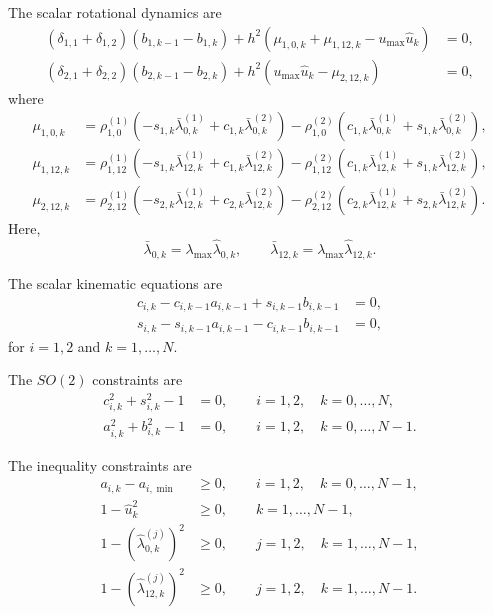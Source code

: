 The scalar rotational dynamics are
\begin{align}
(\delta_{1,1}+\delta_{1,2})
(b_{1,k-1}-b_{1,k})
+
h^2
\left(
\mu_{1,0,k}
+
\mu_{1,12,k}
-
u_{\max}\hat u_k
\right)
&=0,
\label{eq:forced_acrobot_reduced_model2_scalar_rot1}
\\
(\delta_{2,1}+\delta_{2,2})
(b_{2,k-1}-b_{2,k})
+
h^2
\left(
u_{\max}\hat u_k
-
\mu_{2,12,k}
\right)
&=0,
\label{eq:forced_acrobot_reduced_model2_scalar_rot2}
\end{align}
where
\begin{align}
\mu_{1,0,k}
&=
\rho_{1,0}^{(1)}
\left(
-s_{1,k}\bar{\lambda}_{0,k}^{(1)}
+
c_{1,k}\bar{\lambda}_{0,k}^{(2)}
\right)
-
\rho_{1,0}^{(2)}
\left(
c_{1,k}\bar{\lambda}_{0,k}^{(1)}
+
s_{1,k}\bar{\lambda}_{0,k}^{(2)}
\right),
\\
\mu_{1,12,k}
&=
\rho_{1,12}^{(1)}
\left(
-s_{1,k}\bar{\lambda}_{12,k}^{(1)}
+
c_{1,k}\bar{\lambda}_{12,k}^{(2)}
\right)
-
\rho_{1,12}^{(2)}
\left(
c_{1,k}\bar{\lambda}_{12,k}^{(1)}
+
s_{1,k}\bar{\lambda}_{12,k}^{(2)}
\right),
\\
\mu_{2,12,k}
&=
\rho_{2,12}^{(1)}
\left(
-s_{2,k}\bar{\lambda}_{12,k}^{(1)}
+
c_{2,k}\bar{\lambda}_{12,k}^{(2)}
\right)
-
\rho_{2,12}^{(2)}
\left(
c_{2,k}\bar{\lambda}_{12,k}^{(1)}
+
s_{2,k}\bar{\lambda}_{12,k}^{(2)}
\right).
\end{align}
Here,
\[
\bar{\lambda}_{0,k}
=
\lambda_{\max}\hat\lambda_{0,k},
\qquad
\bar{\lambda}_{12,k}
=
\lambda_{\max}\hat\lambda_{12,k}.
\]

The scalar kinematic equations are
\begin{align}
c_{i,k}
-
c_{i,k-1}a_{i,k-1}
+
s_{i,k-1}b_{i,k-1}
&=0,
\\
s_{i,k}
-
s_{i,k-1}a_{i,k-1}
-
c_{i,k-1}b_{i,k-1}
&=0,
\end{align}
for \(i=1,2\) and \(k=1,\ldots,N\).

The \(SO(2)\) constraints are
\begin{align}
c_{i,k}^2+s_{i,k}^2-1 &=0,
\qquad
i=1,2,\quad k=0,\ldots,N,
\\
a_{i,k}^2+b_{i,k}^2-1 &=0,
\qquad
i=1,2,\quad k=0,\ldots,N-1.
\end{align}

The inequality constraints are
\begin{align}
a_{i,k}-a_{i,\min} &\ge 0,
\qquad
i=1,2,\quad k=0,\ldots,N-1,
\\
1-\hat u_k^2 &\ge 0,
\qquad
k=1,\ldots,N-1,
\\
1-\left(\hat\lambda_{0,k}^{(j)}\right)^2 &\ge 0,
\qquad
j=1,2,\quad k=1,\ldots,N-1,
\\
1-\left(\hat\lambda_{12,k}^{(j)}\right)^2 &\ge 0,
\qquad
j=1,2,\quad k=1,\ldots,N-1.
\end{align}
